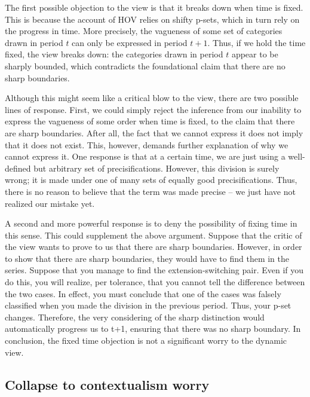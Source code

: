 The first possible objection to the view is that it breaks down when
time is fixed. This is because the account of HOV relies on shifty
p-sets, which in turn rely on the progress in time. More precisely, the
vagueness of some set of categories drawn in period $t$ can only be
expressed in period $t+1$. Thus, if we hold the time fixed, the
view breaks down: the categories drawn in period $t$ appear to be
sharply bounded, which contradicts the foundational claim that there are
no sharp boundaries.

Although this might seem like a critical blow to the view, there are two
possible lines of response. First, we could simply reject the inference
from our inability to express the vagueness of some order when time is
fixed, to the claim that there are sharp boundaries. After all, the fact
that we cannot express it does not imply that it does not exist. This,
however, demands further explanation of why we cannot express it. One
response is that at a certain time, we are just using a well-defined but
arbitrary set of precisifications. However, this division is surely
wrong; it is made under one of many sets of equally good
precisifications. Thus, there is no reason to believe that the term was
made precise -- we just have not realized our mistake yet.

A second and more powerful response is to deny the possibility of fixing
time in this sense. This could supplement the above argument. Suppose
that the critic of the view wants to prove to us that there are sharp
boundaries. However, in order to show that there are sharp boundaries,
they would have to find them in the series. Suppose that you manage to
find the extension-switching pair. Even if you do this, you will
realize, per tolerance, that you cannot tell the difference between the
two cases. In effect, you must conclude that one of the cases was
falsely classified when you made the division in the previous period.
Thus, your p-set changes. Therefore, the very considering of the sharp
distinction would automatically progress us to t+1, ensuring that there
was no sharp boundary. In conclusion, the fixed time objection is not a
significant worry to the dynamic view.

\subsection{Collapse to contextualism worry}

